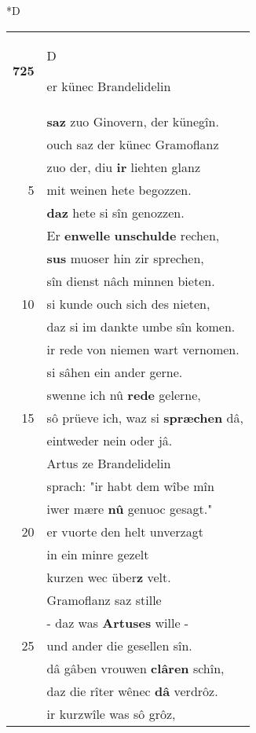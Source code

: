 \documentclass[8pt,a4paper,notitlepage]{article}
\begin{document}
\begin{table}[ht]
\begin{minipage}[t]{0.5\linewidth}
\small
\begin{center}*D
\end{center}
\begin{tabular}{rl}
\textbf{725} & \begin{large}D\end{large}er künec Brandelidelin\\ 
 & \textbf{saz} zuo Ginovern, der künegîn.\\ 
 & ouch saz der künec Gramoflanz\\ 
 & zuo der, diu \textbf{ir} liehten glanz\\ 
5 & mit weinen hete begozzen.\\ 
 & \textbf{daz} hete si sîn genozzen.\\ 
 & Er \textbf{en}\textbf{welle} \textbf{unschulde} rechen,\\ 
 & \textbf{sus} muoser hin zir sprechen,\\ 
 & sîn dienst nâch minnen bieten.\\ 
10 & si kunde ouch sich des nieten,\\ 
 & daz si im dankte umbe sîn komen.\\ 
 & ir rede von niemen wart vernomen.\\ 
 & si sâhen ein ander gerne.\\ 
 & swenne ich nû \textbf{rede} gelerne,\\ 
15 & sô prüeve ich, waz si \textbf{spræchen} dâ,\\ 
 & eintweder nein oder jâ.\\ 
 & Artus ze Brandelidelin\\ 
 & sprach: "ir habt dem wîbe mîn\\ 
 & iwer mære \textbf{nû} genuoc gesagt."\\ 
20 & er vuorte den helt unverzagt\\ 
 & in ein minre gezelt\\ 
 & kurzen wec über\textbf{z} velt.\\ 
 & Gramoflanz saz stille\\ 
 & - daz was \textbf{Artuses} wille -\\ 
25 & und ander die gesellen sîn.\\ 
 & dâ gâben vrouwen \textbf{clâren} schîn,\\ 
 & daz die rîter wênec \textbf{dâ} verdrôz.\\ 
 & ir kurzwîle was sô grôz,\\ 

\end{tabular}
\end{minipage}
\end{table}
\end{document}
